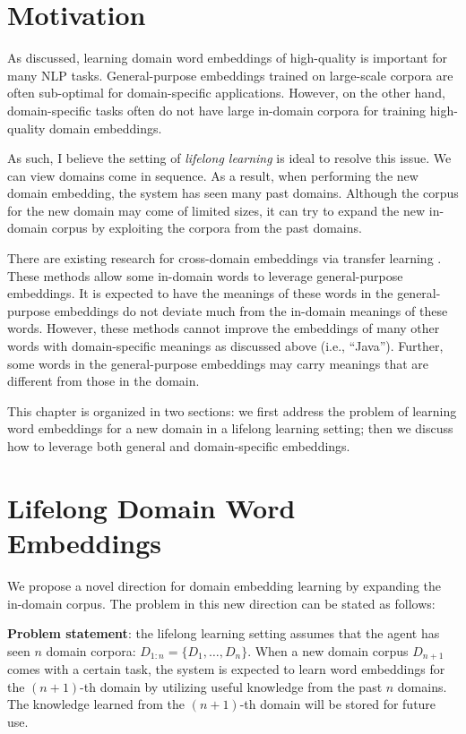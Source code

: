 \section{Motivation}
\label{chap3:sec:intro}

As discussed, learning domain word embeddings of high-quality is important for many NLP tasks. General-purpose embeddings trained on large-scale corpora are often sub-optimal for domain-specific applications. However, on the other hand, domain-specific tasks often do not have large in-domain corpora for training high-quality domain embeddings.

As such, I believe the setting of \textit{lifelong learning} is ideal to resolve this issue. 
We can view domains come in sequence. 
As a result, when performing the new domain embedding, the system has seen many past domains.
Although the corpus for the new domain may come of limited sizes, it can try to expand the new in-domain corpus by exploiting the corpora from the past domains. 

There are existing research for cross-domain embeddings \cite{bollegala-maehara-kawarabayashi:2015:ACL-IJCNLP,yang-lu-zheng:2017:EMNLP2017,bollegala2017think} via transfer learning \cite{pan2010survey}.
These methods allow some in-domain words to leverage general-purpose embeddings.
It is expected to have the meanings of these words in the general-purpose embeddings do not deviate much from the in-domain meanings of these words. 
However, these methods cannot improve the embeddings of many other words with domain-specific meanings as discussed above (i.e., ``Java'').
Further, some words in the general-purpose embeddings may carry meanings that are different from those in the domain. 

This chapter is organized in two sections: we first address the problem of learning word embeddings for a new domain in a lifelong learning setting; then we discuss how to leverage both general and domain-specific embeddings. 

\section{Lifelong Domain Word Embeddings}

We propose a novel direction for domain embedding learning by expanding the in-domain corpus. The problem in this new direction can be stated as follows:

\textbf{Problem statement}: the lifelong learning setting assumes that the agent has seen $n$ domain corpora: $D_{1:n}=\{D_1, \dots, D_n\}$.
When a new domain corpus $D_{n+1}$ comes with a certain task, the system is expected to learn word embeddings for the $(n+1)$-th domain by utilizing useful knowledge from the past $n$ domains.
The knowledge learned from the $(n+1)$-th domain will be stored for future use.

